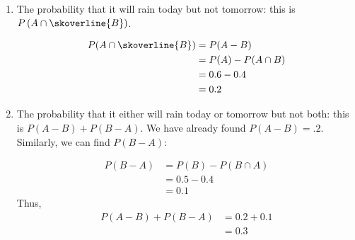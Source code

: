 \begin{example}
\begin{solution}
\begin{enumerate}[label=(\alph*)]
    \item The probability that it will rain today but not tomorrow: this is $P\left(A \cap \skoverline{B}\right)$.
    
    \begin{align*}
        P(A \cap \skoverline{B}) &= P(A - B) \\
                      &= P(A) - P(A \cap B) \\
                      &= 0.6 - 0.4 \\
                      &= 0.2
        \end{align*}
        
    \item The probability that it either will rain today or tomorrow but not both: this is $P(A-B)+P(B-A)$. We have already found $P(A-B)=.2$. Similarly, we can find $P(B-A)$:
    
    \begin{align*}
        P(B-A) & =P(B)-P(B \cap A) \\
        & =0.5-0.4 \\
        & =0.1
        \end{align*}
    Thus,
    \begin{align*}
        P(A-B)+P(B-A) &= 0.2+0.1 \\
                      &= 0.3
    \end{align*}
\end{enumerate}
\end{solution}
\end{example}


